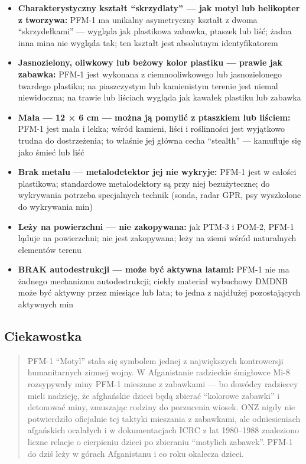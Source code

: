 \documentclass[12pt,oneside]{book}
\providecommand{\tightlist}{%
  \setlength{\itemsep}{0pt}\setlength{\parskip}{0pt}}
\begin{document}
\begin{itemize}
\tightlist
\item
  \textbf{Charakterystyczny kształt ``skrzydlaty'' --- jak motyl lub
  helikopter z tworzywa:} PFM-1 ma unikalny asymetryczny kształt z dwoma
  ``skrzydełkami'' --- wygląda jak plastikowa zabawka, ptaszek lub liść;
  żadna inna mina nie wygląda tak; ten kształt jest absolutnym
  identyfikatorem
\item
  \textbf{Jasnozielony, oliwkowy lub beżowy kolor plastiku --- prawie
  jak zabawka:} PFM-1 jest wykonana z ciemnooliwkowego lub
  jasnozielonego twardego plastiku; na piaszczystym lub kamienistym
  terenie jest niemal niewidoczna; na trawie lub liściach wygląda jak
  kawałek plastiku lub zabawka
\item
  \textbf{Mała --- 12 × 6 cm --- można ją pomylić z ptaszkiem lub
  liściem:} PFM-1 jest mała i lekka; wśród kamieni, liści i roślinności
  jest wyjątkowo trudna do dostrzeżenia; to właśnie jej główna cecha
  ``stealth'' --- kamufluje się jako śmieć lub liść
\item
  \textbf{Brak metalu --- metalodetektor jej nie wykryje:} PFM-1 jest w
  całości plastikowa; standardowe metalodektory są przy niej
  bezużyteczne; do wykrywania potrzeba specjalnych technik (sonda, radar
  GPR, psy wyszkolone do wykrywania min)
\item
  \textbf{Leży na powierzchni --- nie zakopywana:} jak PTM-3 i POM-2,
  PFM-1 ląduje na powierzchni; nie jest zakopywana; leży na ziemi wśród
  naturalnych elementów terenu
\item
  \textbf{BRAK autodestrukcji --- może być aktywna latami:} PFM-1 nie ma
  żadnego mechanizmu autodestrukcji; ciekły materiał wybuchowy DMDNB
  może być aktywny przez miesiące lub lata; to jedna z najdłużej
  pozostających aktywnych min
\end{itemize}

\subsection{Ciekawostka}\label{ciekawostka-126}

\begin{quote}
PFM-1 ``Motyl'' stała się symbolem jednej z największych kontrowersji
humanitarnych zimnej wojny. W Afganistanie radzieckie śmigłowce Mi-8
rozsypywały miny PFM-1 mieszane z zabawkami --- bo dowódcy radzieccy
mieli nadzieję, że afghańskie dzieci będą zbierać ``kolorowe zabawki'' i
detonować miny, zmuszając rodziny do porzucenia wiosek. ONZ nigdy nie
potwierdziło oficjalnie tej taktyki mieszania z zabawkami, ale
odniesieniach afgańskich ocalałych i w dokumentacjach ICRC z lat
1980--1988 znaleziono liczne relacje o cierpieniu dzieci po zbieraniu
``motylich zabawek''. PFM-1 do dziś leży w górach Afganistanu i co roku
okalecza dzieci.
\end{quote}
\end{document}
